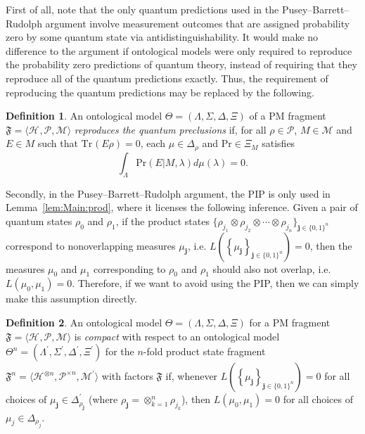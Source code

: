 \documentclass[DIV=calc,paper=a4,fontsize=11pt,twocolumn]{scrartcl} %
\theoremstyle{definition}
\newtheorem{definition}{Definition}[section]
\theoremstyle{plain}
\newcommand{\Hilb}[1][]{\ensuremath{\mathcal{H}_{#1}}}
\newcommand{\Tr}[2][]{\ensuremath{\text{Tr}_{#1} \left ( #2 \right )}}
\begin{document}
First of all, note that the only quantum predictions used in the Pusey--Barrett--Rudolph
argument involve measurement outcomes that are assigned probability
zero by some quantum state via antidistinguishability.  It would make
no difference to the argument if ontological models were only required
to reproduce the probability zero predictions of quantum theory,
instead of requiring that they reproduce all of the quantum
predictions exactly.  Thus, the requirement of reproducing the quantum
predictions may be replaced by the following.

\begin{definition}
An ontological model $\Theta = (\Lambda, \Sigma, \Delta, \Xi)$ of a
PM fragment $\mathfrak{F} = \langle \Hilb, \mathcal{P}, \mathcal{M}
\rangle$ \emph{reproduces the quantum preclusions} if, for all $\rho
\in \mathcal{P}$, $M \in \mathcal{M}$ and $E \in M$ such that $\Tr{E
\rho} = 0$, each $\mu \in \Delta_{\rho}$ and $\text{Pr} \in \Xi_M$
satisfies
\begin{equation}
\int_{\Lambda} \text{Pr}(E|M,\lambda) d \mu(\lambda) = 0.
\end{equation}
\end{definition}

Secondly, in the Pusey--Barrett--Rudolph argument, the PIP is only used in
Lemma~\ref{lem:Main:prod}, where it licenses the following inference.
Given a pair of quantum states $\rho_0$ and $\rho_1$, if the product
states $\{\rho_{j_1} \otimes \rho_{j_2} \otimes \cdots \otimes
\rho_{j_n}\}_{\bm{j} \in \{0,1\}^n}$ correspond to nonoverlapping
measures $\mu_{\bm{j}}$, i.e. $L \left ( \left \{ \mu_{\bm{j}}\right
\}_{\bm{j} \in \{0,1\}^n} \right ) = 0$, then the measures $\mu_0$
and $\mu_1$ corresponding to $\rho_0$ and $\rho_1$ should also not
overlap, i.e. $L(\mu_0,\mu_1) = 0$.  Therefore, if we want to avoid
using the PIP, then we can simply make this assumption directly.

\begin{definition}
An ontological model $\Theta = (\Lambda, \Sigma, \Delta, \Xi)$ for a
PM fragment $\mathfrak{F} = \langle \Hilb, \mathcal{P}, \mathcal{M}
\rangle $ is \emph{compact} with respect to an ontological model
$\Theta^n = (\Lambda^{\prime}, \Sigma^{\prime}, \Delta^{\prime},
\Xi^{\prime})$ for the $n$-fold product state fragment
$\mathfrak{F}^n = \langle \Hilb^{\otimes n}, \mathcal{P}^{\times n},
\mathcal{M}^{\prime} \rangle$ with factors $\mathfrak{F}$ if,
whenever $L \left ( \left \{ \mu_{\bm{j}} \right \}_{\bm{j} \in
\{0,1\}^n} \right ) = 0$ for all choices of $\mu_{\bm{j}} \in
\Delta^{\prime}_{\rho_{\bm{j}}}$ (where $\rho_{\bm{j}} =
\otimes_{k=1}^n \rho_{j_k}$), then $L(\mu_0,\mu_1) = 0$ for all
choices of $\mu_j \in \Delta_{\rho_j}$.
\end{definition}
\end{document}
